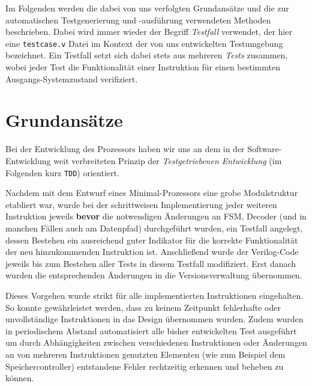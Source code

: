 \documentclass[ngerman, cd=lightcolor]{tudscrreprt}
\begin{document}
Im Folgenden werden die dabei von uns verfolgten Grundansätze und die zur
automatischen Testgenerierung und -ausführung verwendeten Methoden beschrieben.
Dabei wird immer wieder der Begriff \textit{Testfall} verwendet, der hier eine
\texttt{testcase.v} Datei im Kontext der von uns entwickelten Testumgebung
bezeichnet. Ein Testfall setzt sich dabei stets aus mehreren \textit{Tests}
zusammen, wobei jeder Test die Funktionalität einer Instruktion für einen
bestimmten Ausgangs-Systemzustand verifiziert.

\section{Grundansätze}

Bei der Entwicklung des Prozessors haben wir uns an dem in der
Software-Entwicklung weit verbreiteten Prinzip der \textit{Testgetriebenen
Entwicklung} (im Folgenden kurz \texttt{TDD}) orientiert.

Nachdem mit dem Entwurf eines Minimal-Prozessors eine grobe Modulstruktur
etabliert war, wurde bei der schrittweisen Implementierung jeder weiteren
Instruktion jeweils \textbf{bevor} die notwendigen Änderungen an FSM, Decoder
(und in manchen Fällen auch am Datenpfad) durchgeführt wurden, ein Testfall
angelegt, dessen Bestehen ein ausreichend guter Indikator für die korrekte
Funktionalität der neu hinzukommenden Instruktion ist. Anschließend wurde der
Verilog-Code jeweils bis zum Bestehen aller Tests in diesem Testfall
modifiziert. Erst danach wurden die entsprechenden Änderungen in die
Versionsverwaltung übernommen.

Dieses Vorgehen wurde strikt für alle implementierten Instruktionen
eingehalten. So konnte gewährleistet werden, dass zu keinem Zeitpunkt
fehlerhafte oder unvollständige Instruktionen in das Design übernommen wurden.
Zudem wurden in periodischem Abstand automatisiert alle bisher entwickelten
Test ausgeführt um durch Abhängigkeiten zwischen verschiedenen Instruktionen
oder Änderungen an von mehreren Instruktionen genutzten Elementen (wie zum
Beispiel dem Speichercontroller) entstandene Fehler rechtzeitig erkennen und
beheben zu können.
\end{document}
